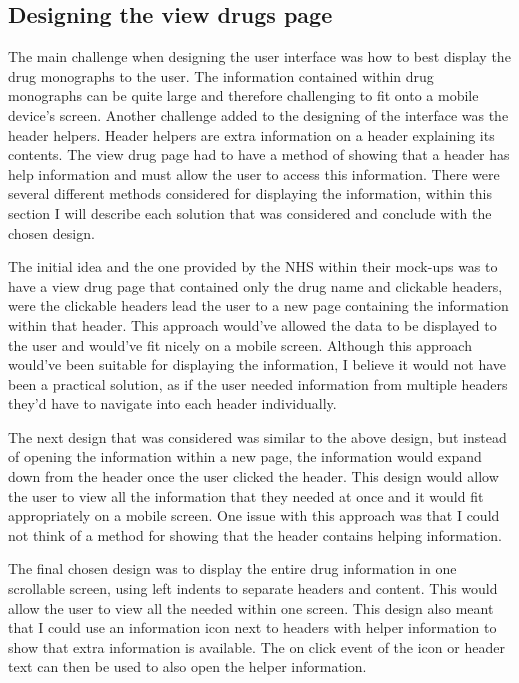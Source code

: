 \subsection{Designing the view drugs page}
The main challenge when designing the user interface was how to best display the drug monographs \cite{monograph} to the user. The information contained within drug monographs can be quite large and therefore challenging to fit onto a mobile device's screen. Another challenge added to the designing of the interface was the header helpers. Header helpers are extra information on a header explaining its contents. The view drug page had to have a method of showing that a header has help information and must allow the user to access this information. There were several different methods considered for displaying the information, within this section I will describe each solution that was considered and conclude with the chosen design.

The initial idea and the one provided by the NHS within their mock-ups was to have a view drug page that contained only the drug name and clickable headers, were the clickable headers lead the user to a new page containing the information within that header. This approach would've allowed the data to be displayed to the user and would've fit nicely on a mobile screen. Although this approach would've been suitable for displaying the information, I believe it would not have been a practical solution, as if the user needed information from multiple headers they'd have to navigate into each header individually.

The next design that was considered was similar to the above design, but instead of opening the information within a new page, the information would expand down from the header once the user clicked the header. This design would allow the user to view all the information that they needed at once and it would fit appropriately on a mobile screen.  One issue with this approach was that I could not think of a method for showing that the header contains helping information.  

The final chosen design was to display the entire drug information in one scrollable screen, using left indents to separate headers and content. This would allow the user to view all the needed within one screen. This design also meant that I could use an information icon next to headers with helper information to show that extra information is available. The on click event of the icon or header text can then be used to also open the helper information.


